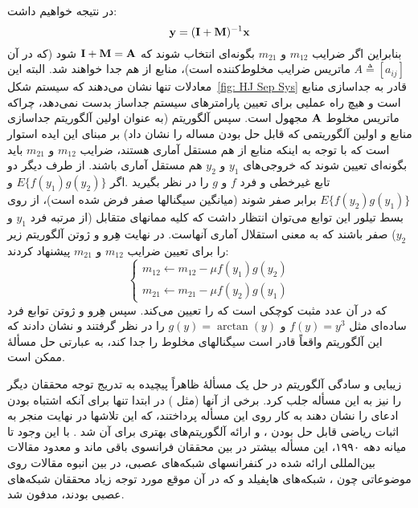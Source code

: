 در نتیجه خواهیم داشت:
\begin{equation}
{\mathbf y} = ({\bf I} + {\mathbf M})^{-1} {\mathbf x}
\end{equation}
بنابراین اگر ضرایب $m_{12}$ و $m_{21}$ بگونه‌ای انتخاب شوند که ${\bf I}+{\mathbf M}={\mathbf A}$ 
شود (که در آن  $A\triangleq[a_{ij}]$ ماتریس ضرایب مخلوط‌کننده است)، 
منابع از هم جدا خواهند شد. البته این معادلات تنها نشان می‌دهند که سیستم 
شکل~\ref{fig: HJ Sep Sys} قادر به جداسازی منابع است و هیچ راه عملیی برای تعیین
پارامترهای سیستم جداساز بدست نمی‌دهد، چراکه ماتریس مخلوط  ${\mathbf A}$
مجهول است. سپس آلگوریتم  (به عنوان اولین آلگوریتم جداسازی منابع و اولین
آلگوریتمی که قابل حل بودن مساله  را نشان داد) بر مبنای این ایده استوار 
است که با توجه به اینکه منابع از هم مستقل آماری هستند، ضرایب  
$m_{12}$ و $m_{21}$ باید بگونه‌ای تعیین شوند که خروجی‌های $y_1$ و $y_2$ 
هم مستقل آماری باشند. از طرف دیگر دو تابع غیرخطی و فرد $f$ و $g$ را در 
نظر بگیرید .اگر $E\{f(y_1)g(y_2)\}$ و $E\{f(y_2)g(y_1)\}$  برابر صفر شوند
(میانگین سیگنالها صفر فرض شده است)، از روی بسط تیلور این توابع می‌توان انتظار
داشت که کلیه ممانهای متقابل (از مرتبه فرد $y_1$ و $y_2$) صفر باشند که به 
معنی استقلال آماری آنهاست. در نهایت  هِرو و ژوتن آلگوریتم زیر را برای تعیین ضرایب 
$m_{12}$ و  $m_{21}$ پیشنهاد کردند:
\begin{equation}
    \left\{
      \begin{array}{rcc}
        m_{12} \leftarrow m_{12} - \mu f(y_1) g(y_2) \\
        m_{21} \leftarrow m_{21} - \mu f(y_2) g(y_1)
      \end{array}
    \right.
\end{equation}
که در آن  عدد مثبت کوچکی است که   را تعیین می‌کند. سپس  هِرو و 
ژوتن توابع فرد ساده‌ای مثل $f(y)=y^3$ و $g(y)=\arctan(y)$ را در نظر گرفتند 
و نشان دادند که این آلگوریتم واقعاً قادر است سیگنالهای مخلوط را جدا کند، به عبارتی حل 
مسألهٔ  ممکن است. 

زیبایی و سادگی آلگوریتم  در حل یک مسألهٔ ظاهراً پیچیده به تدریج توجه
محققان دیگر را نیز به این مسأله جلب کرد. برخی از آنها (مثل  ) در
ابتدا تنها برای آنکه اشتباه بودن ادعای   را نشان دهند به کار روی این مسأله
پرداختند، که این تلاشها در نهایت منجر به اثبات ریاضی قابل حل بودن ، و
ارائه آلگوریتم‌های بهتری برای آن شد \cite{Card89b,LacoR88,Como89c}.
با این وجود تا میانه دهه ۱۹۹۰، این مسأله بیشتر در بین محققان فرانسوی باقی
ماند و معدود مقالات بین‌المللی ارائه شده در کنفرانسهای شبکه‌های عصبی، در
بین انبوه مقالات روی موضوعاتی چون ، شبکه‌های هاپفیلد و
 که در آن موقع مورد توجه زیاد محققان
شبکه‌های عصبی بودند، مدفون شد.

